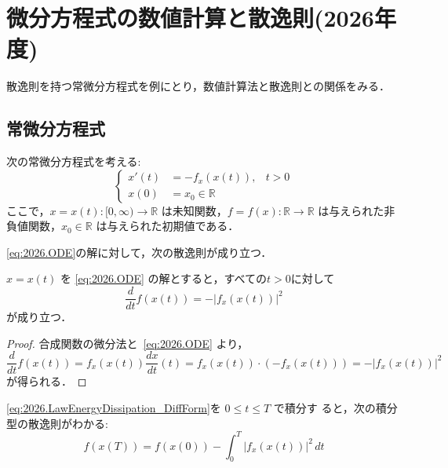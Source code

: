 

\chapter{微分方程式の数値計算と散逸則(2026年度)}

散逸則を持つ常微分方程式を例にとり，数値計算法と散逸則との関係をみる．


 \section{常微分方程式}

 次の常微分方程式を考える:
 \begin{equation}
  \tag{ODE}
   \label{eq:2026.ODE}
   \left\{
    \begin{aligned}
     x'(t) &= -f_x(x(t)), & t > 0 \\
     x(0) &= x_0 \in \mathbb{R}
    \end{aligned}
   \right.
 \end{equation}
 ここで，$x = x(t) : [0, \infty) \rightarrow \mathbb{R}$ は未知関数，$f =
 f(x) : \mathbb{R} \rightarrow \mathbb{R}$ は与えられた非負値関数，$x_0
 \in \mathbb{R}$ は与えられた初期値である．

 \eqref{eq:2026.ODE}の解に対して，次の散逸則が成り立つ．

 \begin{proposition}
  $x = x(t)$ を \eqref{eq:2026.ODE} の解とすると，すべての$t>0$に対して
  \begin{equation}
   \label{eq:2026.LawEnergyDissipation_DiffForm}
    \frac{d}{dt} f(x(t)) = -|f_x(x(t))|^2
  \end{equation}
  が成り立つ．
 \end{proposition}

 \begin{proof}
  合成関数の微分法と~\eqref{eq:2026.ODE} より，
  \begin{equation}
  \frac{d}{dt} f(x(t))
   =
   f_x(x(t))
   \frac{dx}{dt}(t)
   =
   f_x(x(t))
   \cdot
   (-f_x(x(t)))
   =
   -|f_x(x(t))|^2
  \end{equation}
  が得られる．
 \end{proof}

 \eqref{eq:2026.LawEnergyDissipation_DiffForm}を $0 \le t \le T$ で積分す
 ると，次の積分型の散逸則がわかる:
 \begin{equation}
  \label{eq:2026.LawEnergyDissipation_IntegralForm}
   f(x(T)) = f(x(0)) - \int_{0}^{T} |f_x(x(t))|^2 \, dt
 \end{equation}

